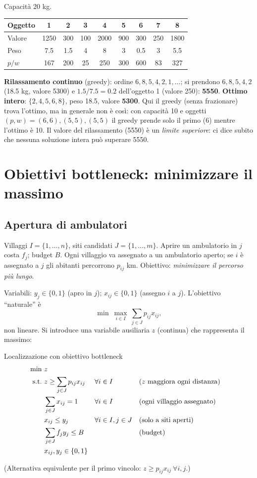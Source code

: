 \begin{esbox}
Capacità 20 kg.
\begin{center}\small
\begin{tabular}{@{}l*{8}{c}@{}}
\toprule
Oggetto & 1&2&3&4&5&6&7&8\\ \midrule
Valore & 1250&300&100&2000&900&300&250&1800\\
Peso & 7.5&1.5&4&8&3&0.5&3&5.5\\
$p/w$ & 167&200&25&250&300&600&83&327\\
\bottomrule
\end{tabular}
\end{center}
\textbf{Rilassamento continuo} (greedy): ordine $6,8,5,4,2,1,\dots$; si prendono $6,8,5,4,2$ (18.5 kg, valore 5300) e $1.5/7.5=0.2$ dell'oggetto 1 (valore 250): \textbf{5550}.
\textbf{Ottimo intero}: $\{2,4,5,6,8\}$, peso 18.5, valore \textbf{5300}. Qui il greedy (senza frazionare) trova l'ottimo, ma in generale non è così: con capacità 10 e oggetti $(p,w)=(6,6),(5,5),(5,5)$ il greedy prende solo il primo (6) mentre l'ottimo è 10.
Il valore del rilassamento (5550) è un \emph{limite superiore}: ci dice subito che nessuna soluzione intera può superare 5550.
\end{esbox}

\section{Obiettivi bottleneck: minimizzare il massimo}\label{sec:bottleneck}

\subsection{Apertura di ambulatori}
Villaggi $I=\{1,\dots,n\}$, siti candidati $J=\{1,\dots,m\}$. Aprire un ambulatorio in $j$ costa $f_j$; budget $B$. Ogni villaggio va assegnato a un ambulatorio aperto; se $i$ è assegnato a $j$ gli abitanti percorrono $p_{ij}$ km. Obiettivo: \emph{minimizzare il percorso più lungo}.

Variabili: $y_j\in\{0,1\}$ (apro in $j$); $x_{ij}\in\{0,1\}$ (assegno $i$ a $j$). L'obiettivo ``naturale'' è
\[ \min\ \max_{i\in I}\ \sum_{j\in J}p_{ij}x_{ij}, \]
non lineare. Si introduce una variabile ausiliaria $z$ (continua) che rappresenta il massimo:

\begin{modello}{Localizzazione con obiettivo bottleneck}
\begin{align*}
\min\ & z\\
\text{s.t.}\ & z\ge \sum_{j\in J}p_{ij}x_{ij} && \forall i\in I &&\text{($z$ maggiora ogni distanza)}\\
& \sum_{j\in J}x_{ij}=1 && \forall i\in I &&\text{(ogni villaggio assegnato)}\\
& x_{ij}\le y_j && \forall i\in I,j\in J &&\text{(solo a siti aperti)}\\
& \sum_{j\in J}f_jy_j\le B &&&&\text{(budget)}\\
& x_{ij},y_j\in\{0,1\}
\end{align*}
\end{modello}
(Alternativa equivalente per il primo vincolo: $z\ge p_{ij}x_{ij}\ \forall i,j$.)

